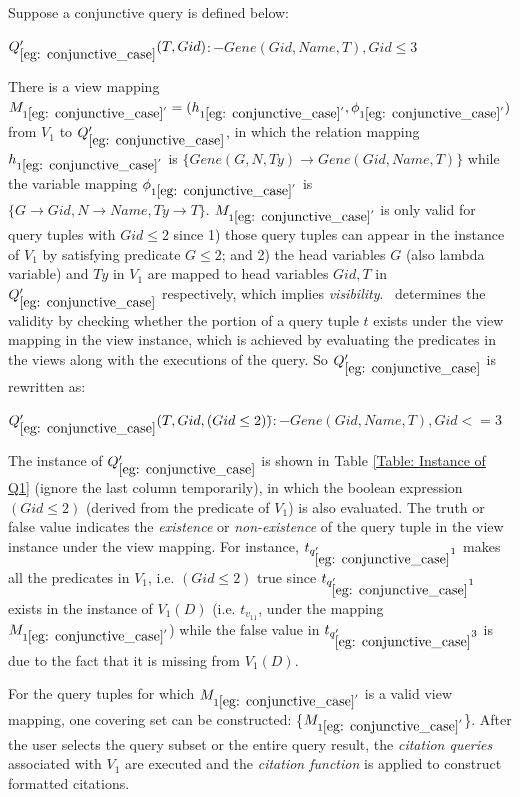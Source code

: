 \begin{example}\label{eg: conjunctive_case}
Suppose a conjunctive query is defined below:
\begin{tabbing}
$Q_{\ref{eg: conjunctive_case}}'(T, Gid) $\hspace{0.05em}$:- Gene(Gid, Name, T), Gid \leq 3$
\end{tabbing}
There is a view mapping $M_{1\ref{eg: conjunctive_case}'} = (h_{1\ref{eg: conjunctive_case}'}, \phi_{1\ref{eg: conjunctive_case}'})$ from $V_1$ to $Q_{\ref{eg: conjunctive_case}}'$, in which the relation mapping $h_{1\ref{eg: conjunctive_case}'}$ is $\{Gene(G, N, Ty) \rightarrow Gene(Gid, Name, T)\}$ while the variable mapping $\phi_{1\ref{eg: conjunctive_case}'}$ is $\{G\rightarrow Gid, N \rightarrow Name, Ty\rightarrow T\}$. $M_{1\ref{eg: conjunctive_case}'}$ is only valid for query tuples with $Gid \leq 2$ since 1) those query tuples can appear in the instance of $V_1$ by satisfying predicate $G \leq 2$; and 2) the head variables $G$ (also lambda variable) and $Ty$ in $V_1$ are mapped to head variables $Gid, T$ in $Q_{\ref{eg: conjunctive_case}}'$ respectively, which implies {\em visibility}. \rba\ determines the validity by checking whether the portion of a query tuple $t$ exists under the view mapping in the view instance, which is achieved by evaluating the predicates in the views along with the executions of the query. So $Q_{\ref{eg: conjunctive_case}}'$ is rewritten as:


\begin{tabbing}
$Q_{\ref{eg: conjunctive_case}}'(T, Gid,(Gid \leq 2))$\hspace{0.1em}\=$:-Gene(Gid, Name, T),Gid <= 3$
\end{tabbing}

The instance of $Q_{\ref{eg: conjunctive_case}}'$ is shown in Table \ref{Table: Instance of Q1} (ignore the last column temporarily), in which the boolean expression $(Gid \leq 2)$ (derived from the predicate of $V_1$) is also evaluated. The truth or false value indicates the {\em existence} or {\em non-existence} of the query tuple in the view instance under the view mapping. For instance, $t_{q_{\ref{eg: conjunctive_case}}'1}$ makes all the predicates in $V_1$, i.e. $(Gid \leq 2)$ true since $t_{q_{\ref{eg: conjunctive_case}}'1}$ exists in the instance of $V_1(D)$ (i.e. $t_{v_11}$, under the mapping $M_{1\ref{eg: conjunctive_case}'}$) while the false value in $t_{q_{\ref{eg: conjunctive_case}}'3}$ is due to the fact that it is missing from $V_1(D)$.

For the query tuples for which $M_{1\ref{eg: conjunctive_case}'}$ is a valid view mapping, one covering set can be constructed:  \{$M_{1\ref{eg: conjunctive_case}'}$\}. After the user selects the query subset or the entire query result,  the \textit{citation queries} associated with $V_1$ are executed and the {\em citation function} is applied to construct formatted citations.
\end{example}
